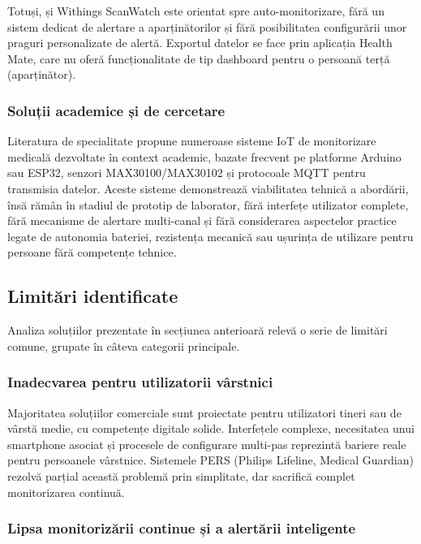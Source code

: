 \documentclass[12pt,a4paper]{article}
\begin{document}
Totuși, și Withings ScanWatch este orientat spre auto-monitorizare, fără un sistem dedicat de alertare a aparținătorilor și fără posibilitatea configurării unor praguri personalizate de alertă. Exportul datelor se face prin aplicația Health Mate, care nu oferă funcționalitate de tip dashboard pentru o persoană terță (aparținător).

\subsubsection{Soluții academice și de cercetare}

Literatura de specialitate propune numeroase sisteme IoT de monitorizare medicală dezvoltate în context academic, bazate frecvent pe platforme Arduino sau ESP32, senzori MAX30100/MAX30102 și protocoale MQTT pentru transmisia datelor. Aceste sisteme demonstrează viabilitatea tehnică a abordării, însă rămân în stadiul de prototip de laborator, fără interfețe utilizator complete, fără mecanisme de alertare multi-canal și fără considerarea aspectelor practice legate de autonomia bateriei, rezistența mecanică sau ușurința de utilizare pentru persoane fără competențe tehnice.

\subsection{Limitări identificate}

Analiza soluțiilor prezentate în secțiunea anterioară relevă o serie de limitări comune, grupate în câteva categorii principale.

\subsubsection{Inadecvarea pentru utilizatorii vârstnici}

Majoritatea soluțiilor comerciale sunt proiectate pentru utilizatori tineri sau de vârstă medie, cu competențe digitale solide. Interfețele complexe, necesitatea unui smartphone asociat și procesele de configurare multi-pas reprezintă bariere reale pentru persoanele vârstnice. Sistemele PERS (Philips Lifeline, Medical Guardian) rezolvă parțial această problemă prin simplitate, dar sacrifică complet monitorizarea continuă.

\subsubsection{Lipsa monitorizării continue și a alertării inteligente}
\end{document}
